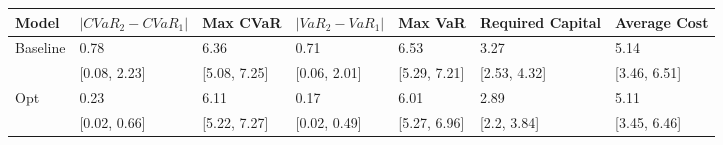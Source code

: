 \begin{tabular}{lllllll}
\toprule
   Model & $|CVaR_2 - CVaR_1|$ &     Max CVaR & $|VaR_2 - VaR_1|$ &      Max VaR & Required Capital & Average Cost \\
\midrule
Baseline &                0.78 &         6.36 &              0.71 &         6.53 &             3.27 &         5.14 \\
         &        [0.08, 2.23] & [5.08, 7.25] &      [0.06, 2.01] & [5.29, 7.21] &     [2.53, 4.32] & [3.46, 6.51] \\
     Opt &                0.23 &         6.11 &              0.17 &         6.01 &             2.89 &         5.11 \\
         &        [0.02, 0.66] & [5.22, 7.27] &      [0.02, 0.49] & [5.27, 6.96] &      [2.2, 3.84] & [3.45, 6.46] \\
\bottomrule
\end{tabular}
